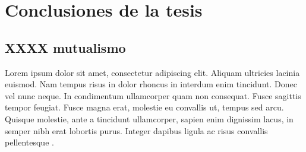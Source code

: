 
\chapter{Conclusiones de la tesis} %

\label{CONCLUSIONES} %


\section{XXXX mutualismo}

Lorem ipsum dolor sit amet, consectetur adipiscing elit. Aliquam ultricies lacinia euismod. Nam tempus risus in dolor rhoncus in interdum enim tincidunt. Donec vel nunc neque. In condimentum ullamcorper quam non consequat. Fusce sagittis tempor feugiat. Fusce magna erat, molestie eu convallis ut, tempus sed arcu. Quisque molestie, ante a tincidunt ullamcorper, sapien enim dignissim lacus, in semper nibh erat lobortis purus. Integer dapibus ligula ac risus convallis pellentesque \citep{Reference3}.
